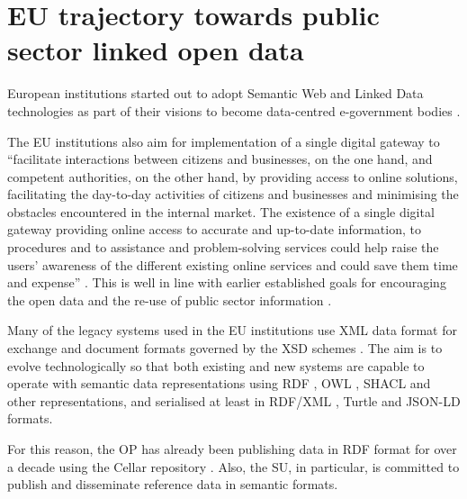 	\section{EU trajectory towards public sector linked open data}
	
	European institutions started out to adopt Semantic Web and Linked Data technologies as part of their visions to become data-centred e-government bodies \citep{decission-456/2005/EC,decission-2015/2240}. 
	
	The EU institutions also aim for implementation of a single digital gateway to ``facilitate interactions between citizens and businesses, on the one hand, and competent authorities, on the other hand, by providing access to online solutions, facilitating the day-to-day activities of citizens and businesses and minimising the obstacles encountered in the internal market. The existence of a single digital gateway providing online access to accurate and up-to-date information, to procedures and to assistance and problem-solving services could help raise the users' awareness of the different existing online services and could save them time and expense'' \citep{directive-2018/1724}. This is well in line with earlier established goals for encouraging the open data and the re-use of public sector information \citep{directive-2013/37/EU,directive-2019/1024}.

	Many of the legacy systems used in the EU institutions use XML data format for exchange and document formats governed by the XSD schemes \citep{xsd1.1-spec}. The aim is to evolve technologically so that both existing and new systems are capable to operate with semantic data representations using RDF \citep{rdf11}, OWL \citep{owl2.0,owl2}, SHACL \citep{shacl-spec} and other representations, and serialised at least in RDF/XML \citep{rdf-xml-Beckett:04:RSS,rdf-xml-Schreiber:14:RXS}, Turtle \citep{turtle-Carothers:14:RT} and JSON-LD \citep{spornyjson,sporny2014json} formats.
	
	For this reason, the OP has already been publishing data in RDF format for over a decade using the Cellar repository \citep{cdm-francesconi2015ontology}. Also, the SU, in particular, is committed to publish and disseminate reference data in semantic formats. 
	
	
